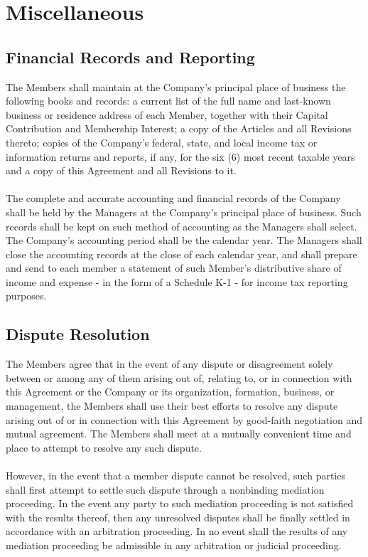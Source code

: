 \documentclass[11pt]{article}
\begin{document}
\section{Miscellaneous}

\subsection{Financial Records and Reporting}
The Members shall maintain at the Company's principal place of business the following books and records: a current list of the full name and last-known business or residence address of each Member, together with their Capital Contribution and Membership Interest; a copy of the Articles and all Revisions thereto; copies of the Company's federal, state, and local income tax or information returns and reports, if any, for the six (6) most recent taxable years and a copy of this Agreement and all Revisions to it.\\\\
The complete and accurate accounting and financial records of the Company shall be held by the Managers at the Company's principal place of business. Such records shall be kept on such method of accounting as the Managers shall select. The Company's accounting period shall be the calendar year. The Managers shall close the accounting records at the close of each calendar year, and shall prepare and send to each member a statement of such Member's distributive share of income and expense - in the form of a Schedule K-1 - for income tax reporting purposes.

\subsection{Dispute Resolution}
The Members agree that in the event of any dispute or disagreement solely between or among any of them arising out of, relating to, or in connection with this Agreement or the Company or its organization, formation, business, or management, the Members shall use their best efforts to resolve any dispute arising out of or in connection with this Agreement by good-faith negotiation and mutual agreement. The Members shall meet at a mutually convenient time and place to attempt to resolve any such dispute.\\\\
However, in the event that a member dispute cannot be resolved, such parties shall first attempt to settle such dispute through a nonbinding mediation proceeding. In the event any party to such mediation proceeding is not satisfied with the results thereof, then any unresolved disputes shall be finally settled in accordance with an arbitration proceeding. In no event shall the results of any mediation proceeding be admissible in any arbitration or judicial proceeding.
\end{document}
